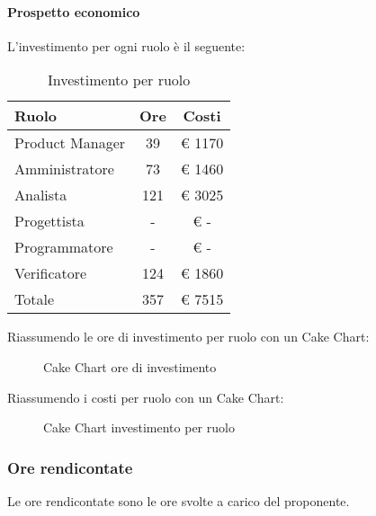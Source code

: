 			\paragraph{Prospetto economico}
				L'investimento per ogni ruolo è il seguente:
				\begin{table}
					\begin{center}
						\begin{tabular}{| l | c | c |}
							\hline
							Ruolo 				& Ore 		& Costi  \\ \hline
							
							Product Manager		& 39 		& \euro{} 1170 	\\
							Amministratore 		& 73 		& \euro{} 1460 	\\
							Analista	 		& 121 		& \euro{} 3025 	\\
							Progettista 		& - 		& \euro{} -  	\\
							Programmatore		& - 		& \euro{} - 	\\
							Verificatore		& 124 		& \euro{} 1860 	\\ \hline \hline
							
							Totale	 			& 357 		& \euro{} 7515 	\\ \hline
						\end{tabular}
					\end{center}
					\caption{Investimento per ruolo}
				\end{table}
				Riassumendo le ore di investimento per ruolo con un Cake Chart:
				\begin{figure}\centering
					\caption{Cake Chart ore di investimento}
				\end{figure}
				Riassumendo i costi per ruolo con un Cake Chart:
				\begin{figure}\centering
					\caption{Cake Chart investimento per ruolo}
				\end{figure}
		\subsubsection{Ore rendicontate}
			Le ore rendicontate sono le ore svolte a carico del proponente.
